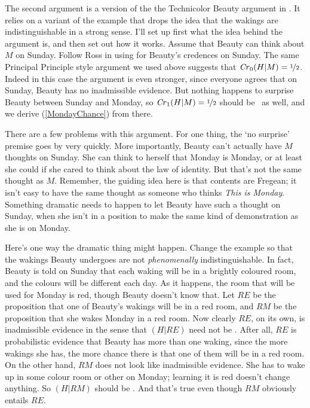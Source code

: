 The second argument is a version of the the Technicolor Beauty argument in \citet{Titlebaum2008}. It relies on a variant of the example that drops the idea that the wakings are indistinguishable in a strong sense. I'll set up first what the idea behind the argument is, and then set out how it works. Assume that Beauty can think about $M$ on Sunday. Follow Ross in using  for Beauty's credences on Sunday. The same Principal Principle style argument we used above suggests that $\text{\textit{Cr}}_0(H | M) = \nicefrac{1}{2}$. Indeed in this case the argument is even stronger, since everyone agrees that on Sunday, Beauty has no inadmissible evidence. But nothing happens to surprise Beauty between Sunday and Monday, so $\text{\textit{Cr}}_1(H | M) = \nicefrac{1}{2}$ should be \half\ as well, and we derive (\ref{MondayChance}) from there.

There are a few problems with this argument. For one thing, the `no surprise' premise goes by very quickly. More importantly, Beauty can't actually have $M$ thoughts on Sunday. She can think to herself that Monday is Monday, or at least she could if she cared to think about the law of identity. But that's not the same thought as $M$. Remember, the guiding idea here is that contents are Fregean; it isn't easy to have the same thought as someone who thinks \textit{This is Monday}. Something dramatic needs to happen to let Beauty have such a thought on Sunday, when she isn't in a position to make the same kind of demonstration as she is on Monday.

Here's one way the dramatic thing might happen. Change the example so that the wakings Beauty undergoes are not \textit{phenomenally} indistinguishable. In fact, Beauty is told on Sunday that each waking will be in a brightly coloured room, and the colours will be different each day. As it happens, the room that will be used for Monday is red, though Beauty doesn't know that. Let $RE$ be the proposition that one of Beauty's wakings will be in a red room, and $RM$ be the proposition that she wakes Monday in a red room. Now clearly $RE$, on its own, is inadmissible evidence in the sense that $(H | RE)$ need not be \half. After all, $RE$ is probabilistic evidence that Beauty has more than one waking, since the more wakings she has, the more chance there is that one of them will be in a red room. On the other hand, $RM$ does not look like inadmissible evidence. She has to wake up in some colour room or other on Monday; learning it is red doesn't change anything. So $(H | RM)$ should be \half. And that's true even though $RM$ obviously entails $RE$.

